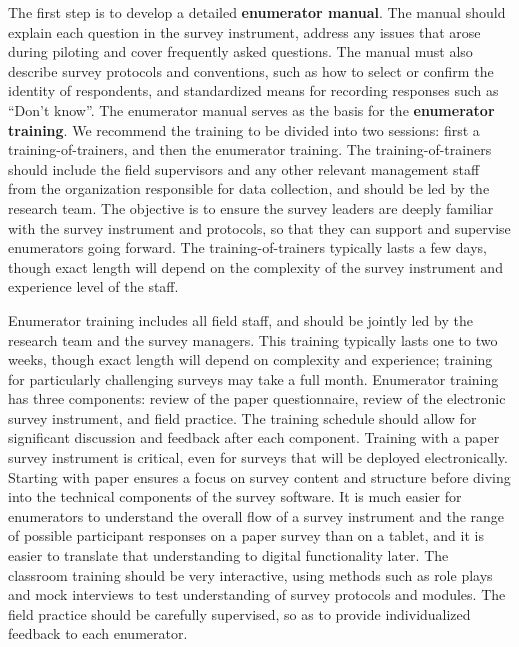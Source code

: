 The first step is to develop a detailed \textbf{enumerator manual}.
The manual should explain each question in the survey instrument,
address any issues that arose during piloting
and cover frequently asked questions.
The manual must also describe survey protocols and conventions,
such as how to select or confirm the identity of respondents,
and standardized means for recording responses such as ``Don't know''.
The enumerator manual serves as the basis for the \textbf{enumerator training}.
We recommend the training to be divided into two sessions:
first a training-of-trainers, and then the enumerator training.
The training-of-trainers should include the field supervisors
and any other relevant management staff from the organization responsible for data collection,
and should be led by the research team.
The objective is to ensure the survey leaders are
deeply familiar with the survey instrument and protocols,
so that they can support and supervise enumerators going forward.
The training-of-trainers typically lasts a few days,
though exact length will depend on the complexity of the
survey instrument and experience level of the staff.

Enumerator training includes all field staff,
and should be jointly led by the research team
and the survey managers.
This training typically lasts one to two weeks,
though exact length will depend on complexity and experience;
training for particularly challenging surveys may take a full month.
Enumerator training has three components: review of the paper questionnaire,
review of the electronic survey instrument, and field practice.
The training schedule should allow for significant discussion and feedback
after each component.
Training with a paper survey instrument is critical,
even for surveys that will be deployed electronically.
Starting with paper ensures a focus on survey content and structure
before diving into the technical components of the survey software.
It is much easier for enumerators to understand
the overall flow of a survey instrument and
the range of possible participant responses
on a paper survey than on a tablet,
and it is easier to translate that understanding to
digital functionality later.
The classroom training should be very interactive, using methods such as role plays
and mock interviews to test understanding of survey protocols and modules.
The field practice should be carefully supervised,
so as to provide individualized feedback to each enumerator.

